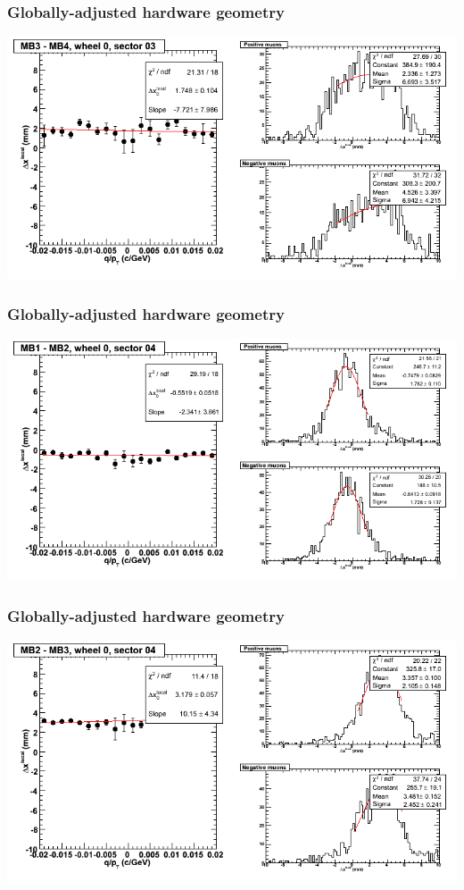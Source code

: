\documentclass[compress]{beamer}
\begin{document}
\begin{frame}
\frametitle{Globally-adjusted hardware geometry}
\includegraphics[width=\linewidth]{NOV4_segdiffs_HW/dt13_resid_C_03_34.png}
\end{frame}

\begin{frame}
\frametitle{Globally-adjusted hardware geometry}
\includegraphics[width=\linewidth]{NOV4_segdiffs_HW/dt13_resid_C_04_12.png}
\end{frame}

\begin{frame}
\frametitle{Globally-adjusted hardware geometry}
\includegraphics[width=\linewidth]{NOV4_segdiffs_HW/dt13_resid_C_04_23.png}
\end{frame}
\end{document}
